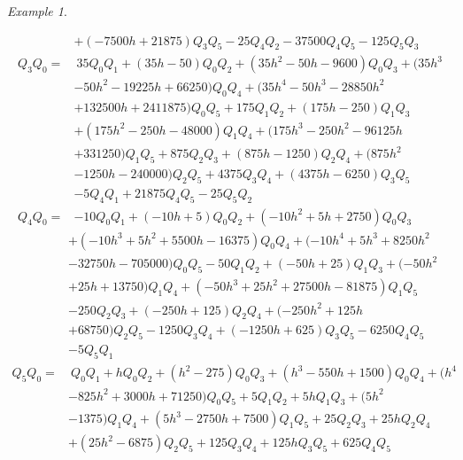 \documentclass{gtpart}
\theoremstyle{definition}
\theoremstyle{remark}
\newtheorem{ex}[equation]{Example}
\renewcommand{\=}{\approx}
\renewcommand{\-}{\sim}
\numberwithin{equation}{section}
\begin{document}
\begin{ex}
\begin{itemize}
\begin{equation*}
\begin{split}
              & + (-7500 h + 21875) Q_3 Q_5 - 25 Q_4 Q_2 - 37500 Q_4 Q_5 - 125 Q_5 Q_3 \\
    Q_3 Q_0 = & ~ 35 Q_0 Q_1 + (35 h - 50) Q_0 Q_2 + (35 h^2 - 50 h - 9600) Q_0 Q_3 + (35 h^3 \\
              & - 50 h^2 - 19225 h + 66250) Q_0 Q_4 + (35 h^4 - 50 h^3 - 28850 h^2 \\
              & + 132500 h + 2411875) Q_0 Q_5 + 175 Q_1 Q_2 + (175 h - 250) Q_1 Q_3 \\
              & + (175 h^2 - 250 h - 48000) Q_1 Q_4 + (175 h^3 - 250 h^2 - 96125 h \\
              & + 331250) Q_1 Q_5 + 875 Q_2 Q_3 + (875 h - 1250) Q_2 Q_4 + (875 h^2 \\
              & - 1250 h - 240000) Q_2 Q_5 + 4375 Q_3 Q_4 + (4375 h - 6250) Q_3 Q_5 \\
              & - 5 Q_4 Q_1 + 21875 Q_4 Q_5 - 25 Q_5 Q_2 \\
    Q_4 Q_0 = & -10 Q_0 Q_1 + (-10 h + 5) Q_0 Q_2 + (-10 h^2 + 5 h + 2750) Q_0 Q_3 
   \end{split}
  \end{equation*}
  \begin{equation*}
   \begin{split}
              & + (-10 h^3 + 5 h^2 + 5500 h - 16375) Q_0 Q_4 + (-10 h^4 + 5 h^3 + 8250 h^2 \\
              & - 32750 h - 705000) Q_0 Q_5 - 50 Q_1 Q_2 + (-50 h + 25) Q_1 Q_3 + (-50 h^2 \\
              & + 25 h + 13750) Q_1 Q_4 + (-50 h^3 + 25 h^2 + 27500 h - 81875) Q_1 Q_5 \\
              & - 250 Q_2 Q_3 + (-250 h + 125) Q_2 Q_4 + (-250 h^2 + 125 h \\
              & + 68750) Q_2 Q_5 - 1250 Q_3 Q_4 + (-1250 h + 625) Q_3 Q_5 - 6250 Q_4 Q_5 \\
              & - 5 Q_5 Q_1 \\
    Q_5 Q_0 = & ~ Q_0 Q_1 + h Q_0 Q_2 + (h^2 - 275) Q_0 Q_3 + (h^3 - 550 h + 1500) Q_0 Q_4 + (h^4 \\
              & - 825 h^2 + 3000 h + 71250) Q_0 Q_5 + 5 Q_1 Q_2 + 5 h Q_1 Q_3 + (5 h^2 \\
              & - 1375) Q_1 Q_4 + (5 h^3 - 2750 h + 7500) Q_1 Q_5 + 25 Q_2 Q_3 + 25 h Q_2 Q_4\\
              & + (25 h^2 - 6875) Q_2 Q_5 + 125 Q_3 Q_4 + 125 h Q_3 Q_5 + 625 Q_4 Q_5 
   \end{split}
  \end{equation*}


\end{itemize}
\end{ex}
\end{document}

